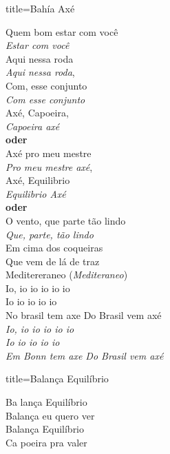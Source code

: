 \documentclass[fontsize=14pt, twoside]{scrreprt}
\begin{document}
\begin{multicols*}{2}
\begin{song}{title={Bahía Axé}}
    \begin{verse*}
        Quem bom estar com você\\
        \textit{Estar com você}\\
        Aqui nessa roda\\
        \textit{Aqui nessa roda},\\
        Com, esse conjunto\\
        \textit{Com esse conjunto}\\
        Axé, Capoeira, \\
        \textit{Capoeira axé}\\
        \textbf{oder} \\
        Axé pro meu mestre\\
        \textit{Pro meu mestre axé},\\

        Axé, Equilibrio \\
        \textit{Equilibrio Axé} \\ 
        \textbf{oder} \\
        O vento, que parte tão lindo\\
        \textit{Que, parte, tão lindo}\\
        Em cima dos coqueiras\\
        Que vem de lá de traz\\
        Meditereraneo (\textit{Mediteraneo})\\
        Io, io io io io io\\
        Io io io io io\\
        No brasil tem axe Do Brasil vem axé\\
        \textit{Io, io io io io io}\\
        \textit{Io io io io io}\\
        \textit{Em Bonn tem axe Do Brasil vem axé}\\

    \end{verse*}
\end{song}


\columnbreak
\begin{song}{title={Balança Equilíbrio}}
    \begin{verse*}
        Ba lança Equilíbrio\\
        Balança eu quero ver\\
        Balança Equilíbrio\\
        Ca poeira pra valer\\


\end{verse*}
\end{song}
\end{multicols*}
\end{document}
